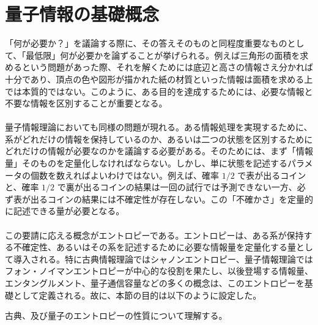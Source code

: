 \documentclass[a4paper,10.5pt]{article}
\numberwithin{equation}{section}
\begin{document}
\section{量子情報の基礎概念}
「何が必要か？」を議論する際に、その答えそのものと同程度重要なものとして、「最低限」何が必要かを論ずることが挙げられる。例えば三角形の面積を求めるという問題があった際、それを解くためには底辺と高さの情報さえ分かれば十分であり、頂点の色や図形が描かれた紙の材質といった情報は面積を求める上では本質的ではない。このように、ある目的を達成するためには、必要な情報と不要な情報を区別することが重要となる。\\
\\
量子情報理論においても同様の問題が現れる。ある情報処理を実現するために、系がどれだけの情報を保持しているのか、あるいは二つの状態を区別するためにどれだけの情報が必要なのかを議論する必要がある。そのためには、まず「情報量」そのものを定量化しなければならない。しかし、単に状態を記述するパラメータの個数を数えればよいわけではない。例えば、確率 $1/2$ で表が出るコインと、確率 $1/2$ で裏が出るコインの結果は一回の試行では予測できない一方、必ず表が出るコインの結果には不確定性が存在しない。この「不確かさ」を定量的に記述できる量が必要となる。\\
\\
この要請に応える概念がエントロピーである。エントロピーは、ある系が保持する不確定性、あるいはその系を記述するために必要な情報量を定量化する量として導入される。特に古典情報理論ではシャノンエントロピー、量子情報理論ではフォン・ノイマンエントロピーが中心的な役割を果たし、以後登場する情報量、エンタングルメント、量子通信容量などの多くの概念は、このエントロピーを基礎として定義される。故に、本節の目的は以下のように設定した。
\begin{goalbox}
古典、及び量子のエントロピーの性質について理解する。
\end{goalbox}
\end{document}
